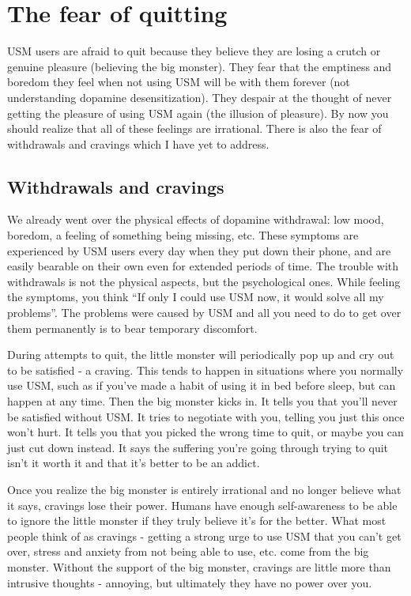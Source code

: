 \documentclass[
  openany]{book}
\begin{document}
\section{The fear of quitting}\label{the-fear-of-quitting}

USM users are afraid to quit because they believe they are losing a crutch or genuine pleasure (believing the big monster). They fear that the emptiness and boredom they feel when not using USM will be with them forever (not understanding dopamine desensitization). They despair at the thought of never getting the pleasure of using USM again (the illusion of pleasure). By now you should realize that all of these feelings are irrational. There is also the fear of withdrawals and cravings which I have yet to address.

\subsection{Withdrawals and cravings}\label{withdrawals-and-cravings}

We already went over the physical effects of dopamine withdrawal: low mood, boredom, a feeling of something being missing, etc. These symptoms are experienced by USM users every day when they put down their phone, and are easily bearable on their own even for extended periods of time. The trouble with withdrawals is not the physical aspects, but the psychological ones. While feeling the symptoms, you think ``If only I could use USM now, it would solve all my problems''. The problems were caused by USM and all you need to do to get over them permanently is to bear temporary discomfort.

During attempts to quit, the little monster will periodically pop up and cry out to be satisfied - a craving. This tends to happen in situations where you normally use USM, such as if you've made a habit of using it in bed before sleep, but can happen at any time. Then the big monster kicks in. It tells you that you'll never be satisfied without USM. It tries to negotiate with you, telling you just this once won't hurt. It tells you that you picked the wrong time to quit, or maybe you can just cut down instead. It says the suffering you're going through trying to quit isn't it worth it and that it's better to be an addict.

Once you realize the big monster is entirely irrational and no longer believe what it says, cravings lose their power. Humans have enough self-awareness to be able to ignore the little monster if they truly believe it's for the better. What most people think of as cravings - getting a strong urge to use USM that you can't get over, stress and anxiety from not being able to use, etc. come from the big monster. Without the support of the big monster, cravings are little more than intrusive thoughts - annoying, but ultimately they have no power over you.
\end{document}
